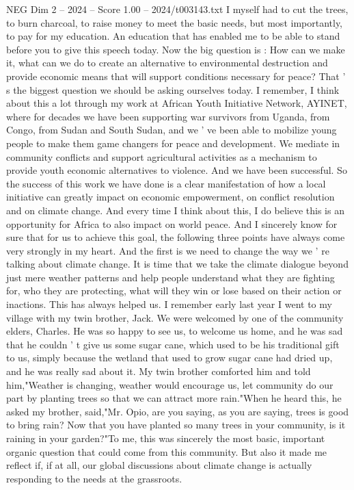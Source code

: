 \begin{textsample}{NEG Dim 2 – 2024 – Score 1.00 – 2024/t003143.txt}
I myself had to cut the trees, to burn charcoal, to raise money to meet the basic needs, but most importantly, to pay for my education.
An education that has enabled me to be able to stand before you to give this speech today.
Now the big question is : How can we make it, what can we do to create an alternative to environmental destruction and provide economic means that will support conditions necessary for peace?
That ' s the biggest question we should be asking ourselves today.
I remember, I think about this a lot through my work at African Youth Initiative Network, AYINET, where for decades we have been supporting war survivors from Uganda, from Congo, from Sudan and South Sudan, and we ' ve been able to mobilize young people to make them game changers for peace and development.
We mediate in community conflicts and support agricultural activities as a mechanism to provide youth economic alternatives to violence.
And we have been successful.
So the success of this work we have done is a clear manifestation of how a local initiative can greatly impact on economic empowerment, on conflict resolution and on climate change.
And every time I think about this, I do believe this is an opportunity for Africa to also impact on world peace.
And I sincerely know for sure that for us to achieve this goal, the following three points have always come very strongly in my heart.
And the first is we need to change the way we ' re talking about climate change.
It is time that we take the climate dialogue beyond just mere weather patterns and help people understand what they are fighting for, who they are protecting, what will they win or lose based on their action or inactions.
This has always helped us.
I remember early last year I went to my village with my twin brother, Jack.
We were welcomed by one of the community elders, Charles.
He was so happy to see us, to welcome us home, and he was sad that he couldn ' t give us some sugar cane, which used to be his traditional gift to us, simply because the wetland that used to grow sugar cane had dried up, and he was really sad about it.
My twin brother comforted him and told him,"Weather is changing, weather would encourage us, let community do our part by planting trees so that we can attract more rain."When he heard this, he asked my brother, said,"Mr.
Opio, are you saying, as you are saying, trees is good to bring rain?
Now that you have planted so many trees in your community, is it raining in your garden?"To me, this was sincerely the most basic, important organic question that could come from this community.
But also it made me reflect if, if at all, our global discussions about climate change is actually responding to the needs at the grassroots.

\end{textsample}
